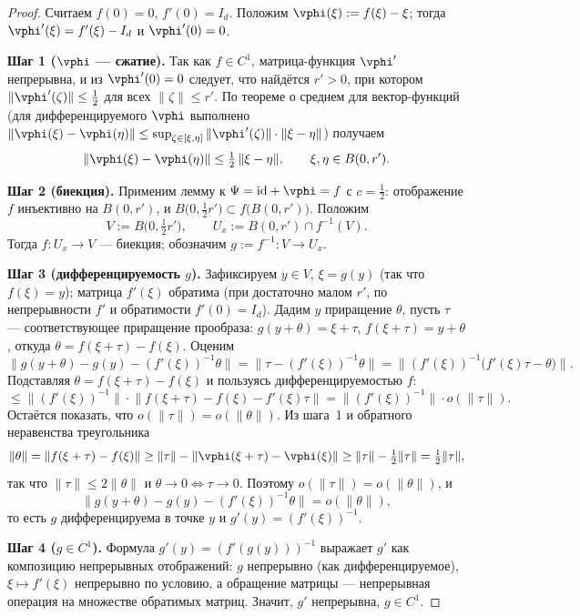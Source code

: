 \begin{proof}
	Считаем $f(0)=0$, $f'(0)=I_d$. Положим $\vphi(\xi):=f(\xi)-\xi$; тогда
	$\vphi'(\xi)=f'(\xi)-I_d$ и $\vphi'(0)=0$.

	\textbf{Шаг 1 ($\vphi$ --- сжатие).} Так как $f\in C^1$, матрица-функция $\vphi'$
	непрерывна, и из $\vphi'(0)=0$ следует, что найдётся $r'>0$, при котором
	$\|\vphi'(\zeta)\|\le\tfrac12$ для всех $\|\zeta\|\le r'$. По теореме о среднем для
	вектор-функций (для дифференцируемого $\vphi$ выполнено
	$\|\vphi(\xi)-\vphi(\eta)\|\le\sup_{\zeta\in[\xi,\eta]}\|\vphi'(\zeta)\|\cdot\|\xi-\eta\|$)
	получаем
	\[
	\|\vphi(\xi)-\vphi(\eta)\|\le\tfrac12\,\|\xi-\eta\|,\qquad \xi,\eta\in B(0,r').
	\]

	\textbf{Шаг 2 (биекция).} Применим лемму к $\Psi=\mathrm{id}+\vphi=f$ с $c=\tfrac12$:
	отображение $f$ инъективно на $B(0,r')$, и
	$B\bigl(0,\tfrac12 r'\bigr)\subset f\bigl(B(0,r')\bigr)$. Положим
	\[
	V:=B\bigl(0,\tfrac12 r'\bigr),\qquad U_x:=B(0,r')\cap f^{-1}(V).
	\]
	Тогда $f\colon U_x\to V$ --- биекция; обозначим $g:=f^{-1}\colon V\to U_x$.

	\textbf{Шаг 3 (дифференцируемость $g$).} Зафиксируем $y\in V$, $\xi=g(y)$ (так что
	$f(\xi)=y$); матрица $f'(\xi)$ обратима (при достаточно малом $r'$, по
	непрерывности $f'$ и обратимости $f'(0)=I_d$). Дадим $y$ приращение $\theta$,
	пусть $\tau$ --- соответствующее приращение прообраза:
	$g(y+\theta)=\xi+\tau$, $f(\xi+\tau)=y+\theta$, откуда $\theta=f(\xi+\tau)-f(\xi)$.
	Оценим
	\[
	\bigl\|g(y+\theta)-g(y)-(f'(\xi))^{-1}\theta\bigr\|
	=\bigl\|\tau-(f'(\xi))^{-1}\theta\bigr\|
	=\bigl\|(f'(\xi))^{-1}\bigl(f'(\xi)\tau-\theta\bigr)\bigr\|.
	\]
	Подставляя $\theta=f(\xi+\tau)-f(\xi)$ и пользуясь дифференцируемостью $f$:
	\[
	\le\|(f'(\xi))^{-1}\|\cdot\bigl\|f(\xi+\tau)-f(\xi)-f'(\xi)\tau\bigr\|
	=\|(f'(\xi))^{-1}\|\cdot o(\|\tau\|).
	\]
	Остаётся показать, что $o(\|\tau\|)=o(\|\theta\|)$. Из шага~1 и обратного
	неравенства треугольника
	\[
	\|\theta\|=\|f(\xi+\tau)-f(\xi)\|\ge\|\tau\|-\|\vphi(\xi+\tau)-\vphi(\xi)\|
	\ge\|\tau\|-\tfrac12\|\tau\|=\tfrac12\|\tau\|,
	\]
	так что $\|\tau\|\le 2\|\theta\|$ и $\theta\to0\iff\tau\to0$. Поэтому
	$o(\|\tau\|)=o(\|\theta\|)$, и
	\[
	\bigl\|g(y+\theta)-g(y)-(f'(\xi))^{-1}\theta\bigr\|=o(\|\theta\|),
	\]
	то есть $g$ дифференцируема в точке $y$ и $g'(y)=(f'(\xi))^{-1}$.

	\textbf{Шаг 4 ($g\in C^1$).} Формула $g'(y)=(f'(g(y)))^{-1}$ выражает $g'$ как
	композицию непрерывных отображений: $g$ непрерывно (как дифференцируемое),
	$\xi\mapsto f'(\xi)$ непрерывно по условию, а обращение матрицы --- непрерывная
	операция на множестве обратимых матриц. Значит, $g'$ непрерывна, $g\in C^1$.
\end{proof}
